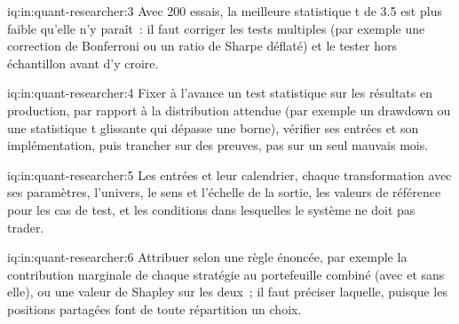 \begin{solution}{iq:in:quant-researcher:3}
Avec 200 essais, la meilleure statistique t de 3.5 est plus faible qu'elle n'y paraît~: il faut corriger les tests multiples (par exemple une correction de Bonferroni
ou un ratio de Sharpe déflaté) et le tester hors échantillon avant d'y croire.
\end{solution}

\begin{solution}{iq:in:quant-researcher:4}
Fixer à l'avance un test statistique sur les résultats en production, par rapport à la distribution attendue (par exemple un drawdown ou une
statistique t glissante qui dépasse une borne), vérifier ses entrées et son implémentation, puis trancher sur des preuves, pas sur un seul mauvais mois.
\end{solution}

\begin{solution}{iq:in:quant-researcher:5}
Les entrées et leur calendrier, chaque transformation avec ses paramètres, l'univers, le sens et l'échelle de la sortie, les valeurs
de référence pour les cas de test, et les conditions dans lesquelles le système ne doit pas trader.
\end{solution}

\begin{solution}{iq:in:quant-researcher:6}
Attribuer selon une règle énoncée, par exemple la contribution marginale de chaque stratégie au portefeuille combiné (avec et sans elle),
ou une valeur de Shapley sur les deux~; il faut préciser laquelle, puisque les positions partagées font de toute répartition un choix.
\end{solution}
